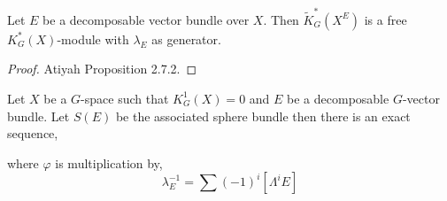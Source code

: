 \documentclass[12pt]{extarticle}
\begin{document}
\begin{prop}
Let $E$ be a decomposable vector bundle over $X$. Then $\tilde{K}_G^*(X^E)$ is a free $K_G^*(X)$-module with $\lambda_E$ as generator.
\end{prop}

\begin{proof}
Atiyah Proposition 2.7.2.
\end{proof}

\begin{theorem}
Let $X$ be a $G$-space such that $K^1_G(X) = 0$ and $E$ be a decomposable $G$-vector bundle. Let $S(E)$ be the associated sphere bundle then there is an exact sequence,
\begin{center}
\end{center}
where $\varphi$ is multiplication by,
\[ \lambda_E^{-1} = \sum (-1)^i [ \Lambda^i E] \]
\end{theorem}
\end{document}
